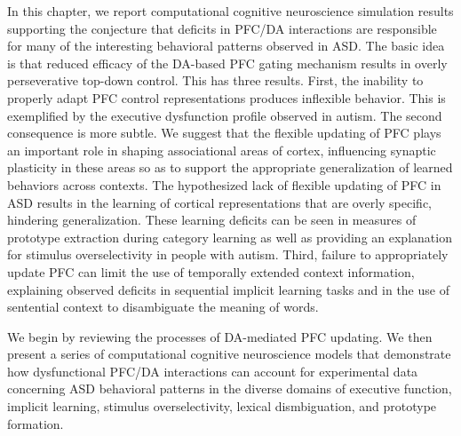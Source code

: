 In this chapter, we report computational cognitive neuroscience simulation results supporting the conjecture that deficits in PFC/DA interactions are responsible for many of the interesting behavioral patterns observed in ASD. The basic idea is that reduced efficacy of the DA-based PFC gating mechanism results in overly perseverative top-down control. This has three results. First, the inability to properly adapt PFC control representations produces inflexible behavior. This is exemplified by the executive dysfunction profile observed in autism. The second consequence is more subtle. We suggest that the flexible updating of PFC plays an important role in shaping associational areas of cortex, influencing synaptic plasticity in these areas so as to support the appropriate generalization of learned behaviors across contexts. The hypothesized lack of flexible updating of PFC in ASD results in the learning of cortical representations that are overly specific, hindering generalization. These learning deficits can be seen in measures of prototype extraction during category learning as well as providing an explanation for stimulus overselectivity in people with autism. Third, failure to appropriately update PFC can limit the use of temporally extended context information, explaining observed deficits in sequential implicit learning tasks and in the use of sentential context to disambiguate the meaning of words.



We begin by reviewing the processes of DA-mediated PFC updating. We then present a series of computational cognitive neuroscience models that demonstrate how dysfunctional PFC/DA interactions can account for experimental data concerning ASD behavioral patterns in the diverse domains of executive function, implicit learning, stimulus overselectivity, lexical dismbiguation, and prototype formation.
